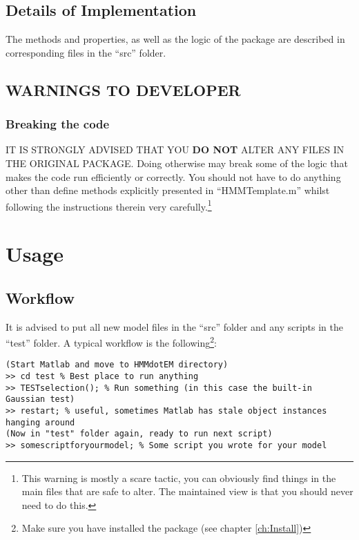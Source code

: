 \documentclass[]{scrreprt}
\begin{document}
\section{Details of Implementation}
The methods and properties, as well as the logic of the package are described in
corresponding files in the ``src'' folder.

\section{WARNINGS TO DEVELOPER}
\subsection{Breaking the code}
IT IS STRONGLY ADVISED THAT YOU {\bf DO NOT} ALTER ANY FILES IN THE ORIGINAL
PACKAGE. Doing otherwise may break some of the logic that makes the code run
efficiently or correctly. You should not have to do anything other than define
methods explicitly presented in ``HMMTemplate.m'' whilst following the
instructions therein very carefully.\footnote{This warning is mostly a scare
tactic, you can obviously find things in the main files that are safe to alter.
The maintained view is that you should never need to do this.}

\chapter{Usage}
\section{Workflow}
It is advised to put all new model files in the ``src'' folder and any
scripts in the ``test'' folder. A typical workflow is the
following\footnote{Make sure you have installed the package (see chapter \ref{ch:Install})}:
\begin{verbatim}
(Start Matlab and move to HMMdotEM directory)
>> cd test % Best place to run anything
>> TESTselection(); % Run something (in this case the built-in Gaussian test)
>> restart; % useful, sometimes Matlab has stale object instances hanging around
(Now in "test" folder again, ready to run next script)
>> somescriptforyourmodel; % Some script you wrote for your model
\end{verbatim}
\end{document}
